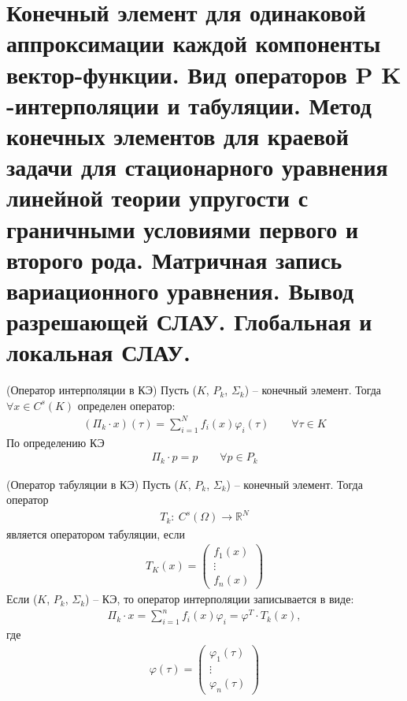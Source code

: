 \documentclass[__main__.tex]{subfiles}
\begin{document}
\section{Конечный элемент для одинаковой аппроксимации каждой компоненты вектор-функции. Вид операторов P K -интерполяции и табуляции. Метод конечных элементов для краевой задачи для стационарного уравнения линейной теории упругости с граничными условиями первого и второго рода. Матричная запись вариационного уравнения. Вывод разрешающей СЛАУ. Глобальная и локальная СЛАУ.}

\begin{definition}
    (Оператор интерполяции в КЭ) Пусть ($K$, $P_k$, $\Sigma_k$) -- конечный элемент. Тогда $\forall x \in C^s(K)$ определен оператор:
    \begin{gather*}
        (\Pi_k \cdot x)(\tau) =\sum_{i=1}^N f_i(x)\varphi_i(\tau) \qquad \forall \tau \in K 
    \end{gather*}
    По определению КЭ 
    \begin{gather*}
        \Pi_k \cdot p = p \qquad \forall p \in P_k
    \end{gather*}
\end{definition}

\begin{definition}
    (Оператор табуляции в КЭ) Пусть ($K$, $P_k$, $\Sigma_k$) -- конечный элемент. Тогда оператор 
    \begin{gather*}
        T_k: \ C^s(\Omega) \rightarrow \mathbb{R}^N
    \end{gather*}
    является оператором табуляции, если 
    \begin{gather*}
        T_K(x) = \left(
        \begin{matrix}
            f_1(x)\\
            \vdots \\
            f_n(x)
        \end{matrix}    
        \right)
    \end{gather*}
    Если ($K$, $P_k$, $\Sigma_k$) -- КЭ, то оператор интерполяции записывается в виде:
    \begin{gather*}
        \Pi_k \cdot x = \sum^n_{i=1} f_i(x) \varphi_i = \varphi^T \cdot T_k(x), 
    \end{gather*}
    где 
    \begin{gather*}
        \varphi(\tau) = \left(
            \begin{matrix}
                \varphi_1(\tau)\\
                \vdots \\
                \varphi_n(\tau)
            \end{matrix}    
            \right)
    \end{gather*}
\end{definition}
\end{document}
